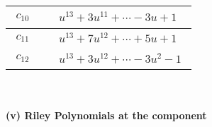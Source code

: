 \documentclass[1p]{elsarticle_modified}
\theoremstyle{definition}
\begin{document}
\begin{tabular}{m{50pt}|m{274pt}}
\hline $$\begin{aligned}c_{10}\end{aligned}$$&$\begin{aligned}
&u^{13}+3 u^{11}+\cdots-3 u+1
\end{aligned}$\\
\hline $$\begin{aligned}c_{11}\end{aligned}$$&$\begin{aligned}
&u^{13}+7 u^{12}+\cdots+5 u+1
\end{aligned}$\\
\hline $$\begin{aligned}c_{12}\end{aligned}$$&$\begin{aligned}
&u^{13}+3 u^{12}+\cdots-3 u^2-1
\end{aligned}$\\
\hline
\end{tabular}\\~\\
\newpage\renewcommand{\arraystretch}{1}
\flushleft \textbf{(v) Riley Polynomials at the component}\newline \\
\end{document}
